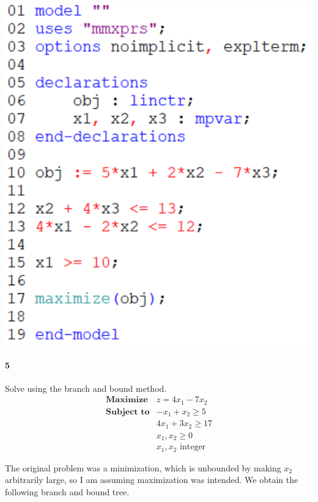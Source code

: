 \documentclass[12pt]{article}
\newenvironment{fullbox}{\begin{lrbox}{\savefullbox}\begin{minipage}{\dimexpr\textwidth-2\fboxsep\relax}}{\end{minipage}\end{lrbox}\begin{center}\framebox[\textwidth]{\usebox{\savefullbox}}\end{center}}
\newenvironment{pbox}[1][]{\begin{fullbox}\ifx#1\empty\else\paragraph{#1}\fi}{\end{fullbox}}
\theoremstyle{definition}
\begin{document}
\begin{center}
\begin{minipage}{0.3\textwidth}
    \end{minipage}
    \begin{minipage}{0.3\textwidth}
        \includegraphics[width=\textwidth]{code1c.png}
    \end{minipage}
\end{center}



\newpage
\begin{pbox}[5]
    Solve using the branch and bound method.
    \[\begin{array}{ll}
        \textbf{Maximize} & z = 4x_1 - 7x_2 \\
        \textbf{Subject to}
            & -x_1 + x_2 \geq 5 \\
            & 4x_1 + 3x_2 \geq 17 \\
            & x_1, x_2 \geq 0 \\
            & x_1, x_2 \text{ integer}
    \end{array}\]
\end{pbox}

The original problem was a minimization, which is unbounded by making $x_2$ arbitrarily large, so I am assuming maximization was intended. We obtain the following branch and bound tree.
\end{document}
